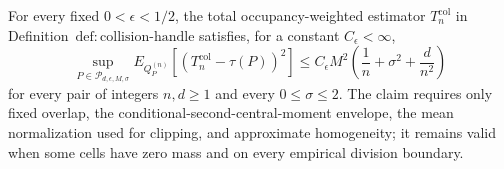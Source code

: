 For every fixed \(0<\epsilon<1/2\), the total occupancy-weighted estimator \(T_n^{\mathrm{col}}\) in Definition~\(\mathrm{def:collision\text{-}handle}\) satisfies, for a constant \(C_{\epsilon}<\infty\),
\[
 \sup_{P\in\mathcal P_{d,\epsilon,M,\sigma}}
 E_{Q_P^{(n)}}[(T_n^{\mathrm{col}}-\tau(P))^2]
 \le C_{\epsilon}M^2\left(\frac1n+\sigma^2+\frac d{n^2}\right)
\]
for every pair of integers \(n,d\ge1\) and every \(0\le\sigma\le2\).  The claim requires only fixed overlap, the conditional-second-central-moment envelope, the mean normalization used for clipping, and approximate homogeneity; it remains valid when some cells have zero mass and on every empirical division boundary.